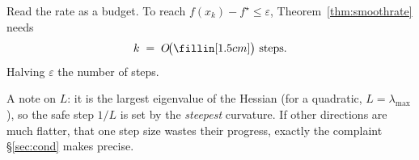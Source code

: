\begin{yourturn}
Read the rate as a budget. To reach $f(x_k)-f^\star\le\varepsilon$, Theorem~\ref{thm:smoothrate}
needs
\[
  k\;=\;O\!\big(\fillin[1.5cm]\big)\ \text{steps.}
\]
Halving $\varepsilon$ \fillin[2.5cm] the number of steps. 
\end{yourturn}

\begin{strand}
A note on $L$: it is the largest eigenvalue of the Hessian (for a quadratic, $L=\lambda_{\max}$), so
the safe step $1/L$ is set by the \emph{steepest} curvature. If other directions are much flatter,
that one step size wastes their progress, exactly the complaint §\ref{sec:cond} makes precise.
\end{strand}
